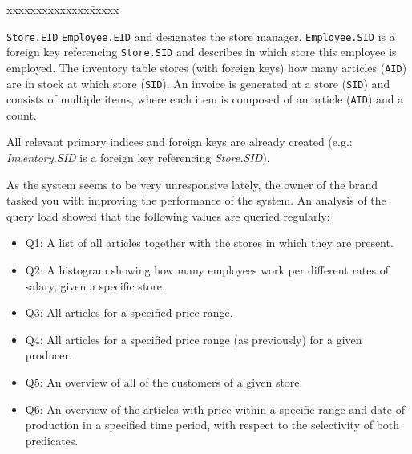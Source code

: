 


\newcommand{\subtitle}{\textbf{Exercise 2}}
\newcommand{\outdate}{05.11.2019}
\newcommand{\duedate}{11.11.2019 16:00 CET}



%


\begin{tabbing}
xxxxxxxxxxxxxx\= xxxxx \kill

\end{tabbing}
{\tt Store.EID}  {\tt Employee.EID} and designates the store manager.
{\tt Employee.SID} is a foreign key referencing {\tt Store.SID} and describes in which store this employee is employed.
The inventory table stores (with foreign keys) how many articles ({\tt AID}) are in stock at which store ({\tt SID}).
An invoice is generated at a store ({\tt SID}) and consists of multiple items, where each item is composed of an article ({\tt AID}) and a count.





All relevant primary indices and foreign keys are already created (e.g.: {\it Inventory.SID} is a foreign key referencing  {\it Store.SID}).

As the system seems to be very unresponsive lately, the owner of the brand tasked you with improving the performance of the system.
An analysis of the query load showed that the following values are queried regularly:

\begin{itemize}
  \item Q1: A list of all articles together with the stores in which they are present.
  \item Q2: A histogram showing how many employees work per different rates of salary, given a specific store.
  \item Q3: All articles for a specified price range.
  \item Q4: All articles for a specified price range (as previously) for a given producer.
  \item Q5: An overview of all of the customers of a given store.
  \item Q6: An overview of the articles with price within a specific range and date of production in a specified time period, with respect to the selectivity of both predicates.
  
  
  
  
  
\end{itemize}

